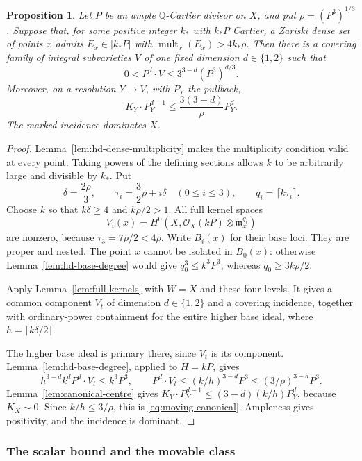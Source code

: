 \documentclass[12pt,a4paper,psamsfonts]{amsart}
\theoremstyle{definition}
\theoremstyle{plain}
\newtheorem{proposition}[lemma]{Proposition}
\newcommand{\OO}{\mathcal O}
\newcommand{\mult}{\operatorname{mult}}
\begin{document}
\begin{proposition}\label{prop:hd-moving-centre}
Let $P$ be an ample $\mathbb{Q}$-Cartier divisor on $X$, and put
$\rho=(P^3)^{1/3}$. Suppose that, for some positive integer $k_*$
with $k_*P$ Cartier, a Zariski dense set of points $x$ admits
$E_x\in|k_*P|$ with $\mult_x(E_x)>4k_*\rho$.
Then there is a covering family of integral subvarieties $V$ of
one fixed dimension $d\in\{1,2\}$ such that
\[
 0<P^d\cdot V\le 3^{3-d}(P^3)^{d/3}.
\]
Moreover, on a resolution $Y\to V$, with $P_Y$ the pullback,
\begin{equation}\label{eq:moving-canonical}
 K_Y\cdot P_Y^{d-1}\le\frac{3(3-d)}{\rho}P_Y^d.
\end{equation}
The marked incidence dominates $X$.
\end{proposition}
\begin{proof}
Lemma~\ref{lem:hd-dense-multiplicity} makes the multiplicity
condition valid at every point. Taking powers of the defining
sections allows $k$ to be arbitrarily large and divisible by $k_*$.
Put
\[
 \delta=\frac{2\rho}{3},\qquad
 \tau_i=\frac32\rho+i\delta\quad(0\le i\le3),\qquad
 q_i=\lceil k\tau_i\rceil.
\]
Choose $k$ so that $k\delta\ge4$ and $k\rho/2>1$.
All full kernel spaces
\[
 V_i(x)=H^0(X,\OO_X(kP)\otimes\mathfrak m_x^{q_i})
\]
are nonzero, because $\tau_3=7\rho/2<4\rho$.
Write $B_i(x)$ for their base loci. They are proper and nested.
The point $x$ cannot be isolated in $B_0(x)$: otherwise
Lemma~\ref{lem:hd-base-degree} would give
$q_0^3\le k^3P^3$, whereas $q_0\ge3k\rho/2$.

Apply Lemma~\ref{lem:full-kernels} with $W=X$ and these four
levels. It gives a common component $V_t$ of dimension
$d\in\{1,2\}$ and a covering incidence, together with
ordinary-power containment for the entire higher base ideal,
where $h=\lceil k\delta/2\rceil$.

The higher base ideal is primary there, since $V_t$ is its component.
Lemma~\ref{lem:hd-base-degree}, applied to $H=kP$, gives
\[
 h^{3-d}k^d P^d\cdot V_t\le k^3P^3,
 \qquad
 P^d\cdot V_t\le(k/h)^{3-d}P^3
 \le(3/\rho)^{3-d}P^3.
\]
Lemma~\ref{lem:canonical-centre} gives
$K_Y\cdot P_Y^{d-1}\le(3-d)(k/h)P_Y^d$, because $K_X\sim0$.
Since $k/h\le3/\rho$, this is \eqref{eq:moving-canonical}.
Ampleness gives positivity, and the incidence is dominant.
\end{proof}

\subsubsection{The scalar bound and the movable class}\label{sec:scalar}
\end{document}
